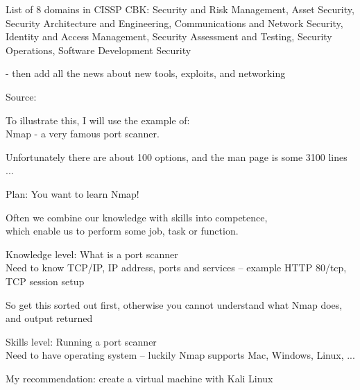 \documentclass[Screen16to9,17pt]{foils}
\begin{document}
List of 8 domains in CISSP CBK: Security and Risk Management, Asset Security,
Security Architecture and Engineering, Communications and Network Security, Identity and Access Management, Security Assessment and Testing, Security Operations, Software Development Security

- then add all the news about new tools, exploits, and networking


Source: 









To illustrate this, I will use the example of:\\
Nmap - a very famous port scanner.

Unfortunately there are about 100 options, and the man page is some 3100 lines ...


Plan: You want to learn Nmap!

{\large Often we combine our knowledge with skills into competence, \\
which enable us to perform some job, task or function.}

\begin{list2}
\item Knowledge level: What is a port scanner\\
Need to know TCP/IP, IP address, ports and services -- example HTTP 80/tcp, TCP session setup
\end{list2}

So get this sorted out first, otherwise you cannot understand what Nmap does, and output returned




\begin{list2}
\item Skills level: Running a port scanner\\
Need to have operating system -- luckily Nmap supports Mac, Windows, Linux, ...
\item My recommendation: create a virtual machine with Kali Linux
\end{list2}
\end{document}
